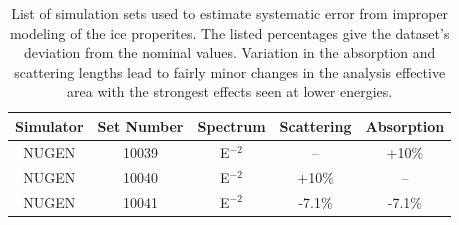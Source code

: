 \documentclass{gatech-thesis}
\begin{document}
\begin{table}[h]
\caption[Ice Properties Systematic Datasets]{List of simulation sets used to estimate systematic error from improper modeling of the ice properites. The listed percentages give the dataset's deviation from the nominal values. Variation in the absorption and scattering lengths lead to fairly minor changes in the analysis effective area with the strongest effects seen at lower energies.\label{tab:ice_sets}}
\begin{center}
\begin{tabular}{ccccc}
\toprule
\textbf{Simulator} & \textbf{Set Number} &\textbf{Spectrum} & \textbf{Scattering} & \textbf{Absorption}\\
\midrule
NUGEN & 10039 & E$^{-2}$ & -- & +10$\%$ \\
NUGEN & 10040 & E$^{-2}$ & +10$\%$ & -- \\
NUGEN & 10041 & E$^{-2}$ & -7.1$\%$ & -7.1$\%$ \\
\hline
\end{tabular}
\end{center}
\end{table}
\end{document}
